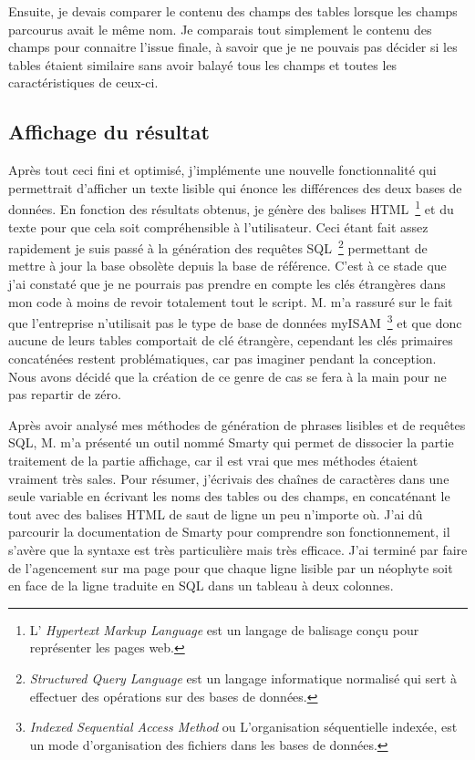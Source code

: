 Ensuite, je devais comparer le contenu des champs des tables lorsque les champs
parcourus avait le même nom. Je comparais tout simplement le contenu des champs
pour connaitre l'issue finale, à savoir que je ne pouvais pas décider si les
tables étaient similaire sans avoir balayé tous les champs et toutes les
caractéristiques de ceux-ci.

\subsection{Affichage du résultat} %
\label{sub:Affichage du résultat}

Après tout ceci fini et optimisé, j'implémente une nouvelle fonctionnalité qui
permettrait d'afficher un texte lisible qui énonce les différences des deux
bases de données. En fonction des résultats obtenus, je génère des balises
HTML\, \footnote{L’ \emph{Hypertext Markup Language} est un langage de balisage
conçu pour représenter les pages web.} et du texte pour que cela soit
compréhensible à l'utilisateur. Ceci étant fait assez rapidement je suis passé
à la génération des requêtes SQL\, \footnote{\emph{Structured Query Language}
est un langage informatique normalisé qui sert à effectuer des opérations sur
des bases de données.} permettant de mettre à jour la base obsolète depuis la
base de référence. C'est à ce stade que j'ai constaté que je ne pourrais pas
prendre en compte les clés étrangères dans mon code à moins de revoir
totalement tout le script. M. m'a rassuré sur le fait que
l'entreprise n'utilisait pas le type de base de données myISAM\,
\footnote{\emph{Indexed Sequential Access Method} ou L'organisation
séquentielle indexée, est un mode d'organisation des fichiers dans les bases de
données.} et que donc aucune de leurs tables comportait de clé étrangère,
cependant les clés primaires concaténées restent problématiques, car pas
imaginer pendant la conception. Nous avons décidé que la création de ce genre
de cas se fera à la main pour ne pas repartir de zéro.

Après avoir analysé mes méthodes de génération de phrases lisibles et de
requêtes SQL, M. m'a présenté un outil nommé \og Smarty \fg{} qui
permet de dissocier la partie traitement de la partie affichage, car il est
vrai que mes méthodes étaient vraiment très sales. Pour résumer, j'écrivais des
chaînes de caractères dans une seule variable en écrivant les noms des tables
ou des champs, en concaténant le tout avec des balises HTML de saut de ligne un
peu n'importe où. J'ai dû parcourir la documentation de Smarty pour comprendre
son fonctionnement, il s'avère que la syntaxe est très particulière mais très
efficace. J'ai terminé par faire de l'agencement sur ma page pour que chaque
ligne lisible par un néophyte soit en face de la ligne traduite en SQL dans un
tableau à deux colonnes.
